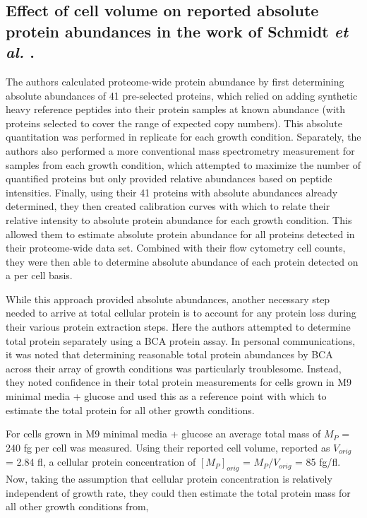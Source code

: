 \subsection{Effect of cell volume on reported absolute protein abundances in the work of Schmidt \textit{et al.} .}

The authors calculated proteome-wide  protein abundance by first determining
absolute abundances of 41 pre-selected proteins, which relied on adding
synthetic heavy reference peptides into their protein samples at known abundance
(with proteins selected to cover the range of expected copy numbers).  This
absolute quantitation was performed in replicate for each growth condition.
Separately, the authors also performed a more conventional mass spectrometry
measurement for samples from each growth condition, which attempted to maximize
the number of quantified proteins but only provided relative abundances based on
peptide intensities. Finally, using their 41 proteins with absolute abundances
already determined, they then created calibration curves with which to relate
their relative intensity to absolute protein abundance for each growth
condition.  This allowed them to estimate absolute protein abundance for all
proteins detected in their proteome-wide data set. Combined with their flow
cytometry cell counts, they were then able to determine absolute abundance of
each protein detected on a per cell basis.

While this approach provided absolute abundances, another necessary step needed
to arrive at total cellular protein is to account for any protein loss during
their various protein extraction steps. Here the authors attempted to determine
total protein separately using a BCA protein assay.  In personal communications,
it was noted that determining reasonable total protein abundances by BCA across
their array of growth conditions  was particularly troublesome. Instead, they
noted confidence in their total protein measurements for cells grown in M9
minimal media + glucose and  used this as a reference point with which to
estimate the total protein for all other growth conditions.

For cells grown in M9 minimal media + glucose an average total mass of $M_P$ =
240 fg per cell was measured. Using their reported cell volume, reported as
$V_{orig}$ = 2.84 fl, a cellular protein concentration of $[M_P]_{orig}$ =
$M_P/V_{orig}$ = 85 fg/fl. Now, taking the assumption that cellular protein
concentration is relatively independent of growth rate, they could then estimate
the total protein mass for all other growth conditions from,

